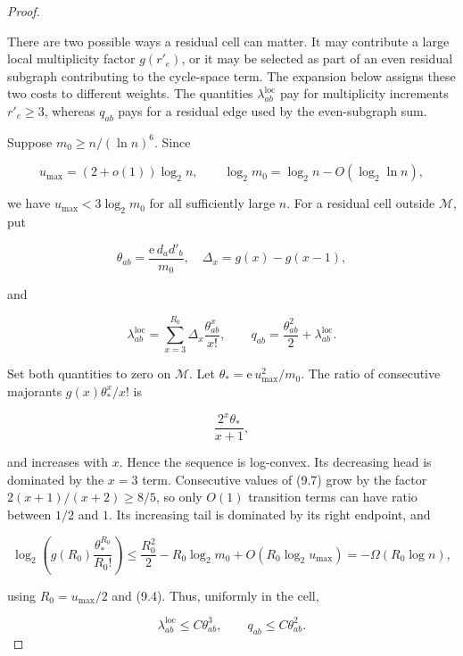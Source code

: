 \documentclass[11pt,reqno]{amsart}
\newcommand{\displayheading}[1]{%
  \par\addvspace{0.68\baselineskip}%
  \noindent{\scshape #1.}\par\nobreak\smallskip\noindent}
\begin{document}
\begin{proof}\label{proof-large-residual-degree}
\displayheading{Large residual mass}

There are two possible ways a residual cell can matter.  It may contribute a
large local multiplicity factor \(g(r'_e)\), or it may be selected as part of
an even residual subgraph contributing to the cycle-space term.  The expansion
below assigns these two costs to different weights.  The quantities
\(\lambda^{\mathrm{loc}}_{ab}\) pay for multiplicity increments \(r'_e\ge3\),
whereas \(q_{ab}\) pays for a residual edge used by the even-subgraph sum.

Suppose \(m_0\ge n/(\ln n)^6\). Since

\[
 u_{\max}=(2+o(1))\log_2 n,\qquad
 \log_2 m_0=\log_2 n-O(\log_2\ln n),                           \tag{9.4}
\]

we have \(u_{\max}<3 \log_2 m_0\) for all sufficiently large
\(n\). For a residual cell outside \(\mathcal M\), put

\[
 \theta_{ab}=\frac{\mathrm{e}\, d_ad'_b}{m_0},\quad
 \Delta_x=g(x)-g(x-1),                                  \tag{9.5}
\]

and

\[
 \lambda^{\mathrm{loc}}_{ab}=\sum_{x=3}^{R_0}\Delta_x
                    \frac{\theta_{ab}^x}{x!},\qquad
 q_{ab}=\frac{\theta_{ab}^2}{2}+\lambda^{\mathrm{loc}}_{ab}.
                                                               \tag{9.6}
\]

Set both quantities to zero on \(\mathcal M\). Let
\(\theta_*=\mathrm{e}\,u_{\max}^2/m_0\). The ratio of consecutive majorants
\(g(x)\theta_*^x/x!\) is

\[
 \frac{2^x\theta_*}{x+1},                                \tag{9.7}
\]

and increases with \(x\). Hence the sequence is log-convex. Its
decreasing head is dominated by the \(x=3\) term. Consecutive
values of (9.7) grow by the factor
\(2(x+1)/(x+2)\ge 8/5\), so only \(O(1)\)
transition terms can have ratio between \(1/2\) and \(1\). Its
increasing tail is dominated by its right endpoint, and

\[
 \log_2\left(g(R_0)\frac{\theta_*^{R_0}}{R_0!}\right)
 \le\frac{R_0^2}{2}-R_0\log_2 m_0+O(R_0\log_2u_{\max})
 =-\Omega(R_0\log n),                                   \tag{9.8}
\]

using \(R_0=u_{\max}/2\) and (9.4). Thus, uniformly in the cell,

\[
 \lambda^{\mathrm{loc}}_{ab}\le C\theta_{ab}^3,\qquad
 q_{ab}\le C\theta_{ab}^2.                              \tag{9.9}
\]


\end{proof}
\end{document}
